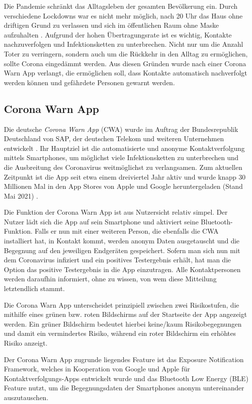 \documentclass[conference,compsoc]{IEEEtran}
\begin{document}
Die Pandemie schränkt das Alltagsleben der gesamten Bevölkerung ein. 
Durch verschiedene Lockdowns war es nicht mehr möglich, nach 20 Uhr das Haus ohne driftigen Grund zu verlassen und sich im öffentlichen Raum ohne Maske aufzuhalten \cite{Notbremse}. 
Aufgrund der hohen Übertragungsrate ist es wichtig, Kontakte nachzuverfolgen und Infektionsketten zu unterbrechen.
Nicht nur um die Anzahl Toter zu verringern, sondern auch um die Rückkehr in den Alltag zu ermöglichen, sollte Corona eingedämmt werden.
Aus diesen Gründen wurde nach einer Corona Warn App verlangt, die ermöglichen soll, dass Kontakte automatisch nachverfolgt werden können und gefährdete Personen gewarnt werden.

\subsection{Corona Warn App}
Die deutsche \textit{Corona Warn App} (CWA) wurde im Auftrag der Bundesrepublik Deutschland von SAP, der deutschen Telekom und weiteren Unternehmen entwickelt \cite{CWA}. 
Ihr Hauptziel ist die automatisierte und anonyme Kontaktverfolgung mittels Smartphones, um möglichst viele Infektionsketten zu unterbrechen und die Ausbreitung des Coronavirus weitmöglichst zu verlangsamen. 
Zum aktuellen Zeitpunkt ist die App seit etwa einem dreiviertel Jahr aktiv und wurde knapp 30 Millionen Mal in den App Stores von Apple und Google heruntergeladen (Stand Mai 2021) \cite{Downloads}.

Die Funktion der Corona Warn App ist aus Nutzersicht relativ simpel. Der Nutzer lädt sich die App auf sein Smartphone und aktiviert seine Bluetooth-Funktion. 
Falls er nun mit einer weiteren Person, die ebenfalls die CWA installiert hat, in Kontakt kommt, werden anonym Daten ausgetauscht und die Begegnung auf den jeweiligen Endgeräten gespeichert. 
Sofern man sich nun mit dem Coronavirus infiziert und ein positives Testergebnis erhält, hat man die Option das positive Testergebnis in die App einzutragen. 
Alle Kontaktpersonen werden daraufhin informiert, ohne zu wissen, von wem diese Mitteilung letztendlich stammt. 

Die Corona Warn App unterscheidet prinzipiell zwischen zwei Risikostufen, die mithilfe eines grünen bzw. roten Bildschirms auf der Startseite der App angezeigt werden. 
Ein grüner Bildschirm bedeutet hierbei keine/kaum Risikobegegnungen und damit ein vermindertes Risiko, während ein roter Bildschirm ein erhöhtes Risiko anzeigt.

Der Corona Warn App zugrunde liegendes Feature ist das \glqq Exposure Notification Framework\grqq, 
welches in Kooperation von Google und Apple für Kontaktverfolgungs-Apps entwickelt wurde und das Bluetooth Low Energy (BLE) Feature nutzt, 
um die Begegnungsdaten der Smartphones anonym untereinander auszutauschen. \\
\end{document}
